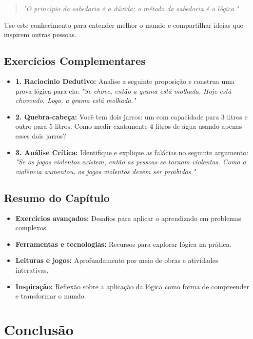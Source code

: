 \documentclass[a4paper,12pt]{book}
\begin{document}
\begin{quote}
    \textit{"O princípio da sabedoria é a dúvida; o método da sabedoria é a lógica."}
\end{quote}

Use este conhecimento para entender melhor o mundo e compartilhar ideias que inspirem outras pessoas.

\section*{Exercícios Complementares}

\begin{itemize}
    \item \textbf{1. Raciocínio Dedutivo:} Analise a seguinte proposição e construa uma prova lógica para ela:  
    \textit{"Se chove, então a grama está molhada. Hoje está chovendo. Logo, a grama está molhada."}
    
    \item \textbf{2. Quebra-cabeça:} Você tem dois jarros: um com capacidade para 3 litros e outro para 5 litros. Como medir exatamente 4 litros de água usando apenas esses dois jarros?
    
    \item \textbf{3. Análise Crítica:} Identifique e explique as falácias no seguinte argumento:  
    \textit{"Se os jogos violentos existem, então as pessoas se tornam violentas. Como a violência aumentou, os jogos violentos devem ser proibidos."}
\end{itemize}

\section*{Resumo do Capítulo}
\begin{itemize}
    \item \textbf{Exercícios avançados:} Desafios para aplicar o aprendizado em problemas complexos.
    \item \textbf{Ferramentas e tecnologias:} Recursos para explorar lógica na prática.
    \item \textbf{Leituras e jogos:} Aprofundamento por meio de obras e atividades interativas.
    \item \textbf{Inspiração:} Reflexão sobre a aplicação da lógica como forma de compreender e transformar o mundo.
\end{itemize}


\chapter*{Conclusão}
\end{document}
